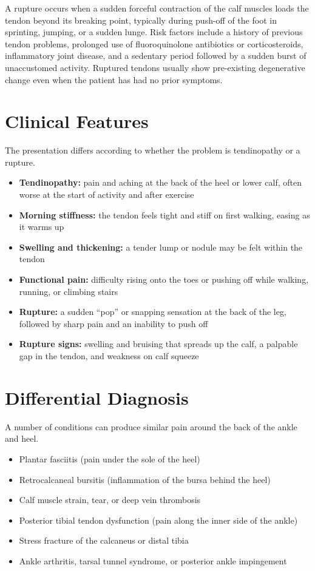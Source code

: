 A rupture occurs when a sudden forceful contraction of the calf muscles loads the tendon beyond its breaking point, typically during push-off of the foot in sprinting, jumping, or a sudden lunge. Risk factors include a history of previous tendon problems, prolonged use of fluoroquinolone antibiotics or corticosteroids, inflammatory joint disease, and a sedentary period followed by a sudden burst of unaccustomed activity. Ruptured tendons usually show pre-existing degenerative change even when the patient has had no prior symptoms.

\section*{Clinical Features}
The presentation differs according to whether the problem is tendinopathy or a rupture.

\begin{itemize}
    \item \textbf{Tendinopathy:} pain and aching at the back of the heel or lower calf, often worse at the start of activity and after exercise
    \item \textbf{Morning stiffness:} the tendon feels tight and stiff on first walking, easing as it warms up
    \item \textbf{Swelling and thickening:} a tender lump or nodule may be felt within the tendon
    \item \textbf{Functional pain:} difficulty rising onto the toes or pushing off while walking, running, or climbing stairs
    \item \textbf{Rupture:} a sudden ``pop'' or snapping sensation at the back of the leg, followed by sharp pain and an inability to push off
    \item \textbf{Rupture signs:} swelling and bruising that spreads up the calf, a palpable gap in the tendon, and weakness on calf squeeze
\end{itemize}

\section*{Differential Diagnosis}
A number of conditions can produce similar pain around the back of the ankle and heel.

\begin{itemize}
    \item Plantar fasciitis (pain under the sole of the heel)
    \item Retrocalcaneal bursitis (inflammation of the bursa behind the heel)
    \item Calf muscle strain, tear, or deep vein thrombosis
    \item Posterior tibial tendon dysfunction (pain along the inner side of the ankle)
    \item Stress fracture of the calcaneus or distal tibia
    \item Ankle arthritis, tarsal tunnel syndrome, or posterior ankle impingement
\end{itemize}


